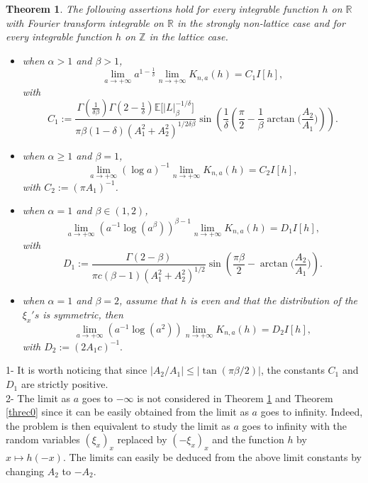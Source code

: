 \documentclass[oneside, a4paper,11pt,reqno]{amsart}
\newtheorem{thm}[hypo]{Theorem}
\begin{document}
\begin{thm}\label{threc2}
The following assertions hold for every integrable function $h$ on $\mathbb R$ 
with Fourier transform integrable on $\mathbb R$ in the strongly non-lattice case and for every integrable function $h$ on $\mathbb Z$ 
 in the lattice case.
\begin{itemize}
\item when $\alpha>1$ and $\beta>1$,
 $$\lim_{a\rightarrow +\infty}  a^{1-\frac 1 \delta}
    \lim_{n\rightarrow +\infty }   K_{n,a}(h)  =C_1  I[h],$$
with
$$ C_1:=\frac{ \Gamma(\frac{1}{\delta\beta})\Gamma(2-\frac{1}{\delta})\mathbb{E} 
\big[|L|_{\beta}^{-1/\delta}\big]}{\pi\beta (1-\delta)(A_1^2 +A_2^2)^{1/2\delta\beta}}
\sin\left(\frac{1}{\delta} \left(\frac{\pi}{2} -\frac{1}{\beta} \arctan 
\Big(\frac{A_2}{A_1}\Big)\right)\right).$$
\item when $\alpha\ge 1$ and $\beta=1$,
 $$\lim_{a\rightarrow +\infty} ( \log a)^{-1}
    \lim_{n\rightarrow +\infty }   K_{n,a}(h)  =C_2  I[h],$$
with $C_2:=(\pi A_1)^{-1}$.
\item when $\alpha=1$ and $\beta\in(1,2)$,
 $$ \lim_{a \rightarrow +\infty} \left(a^{-1}\log (a^\beta)\right)^{\beta-1}
    \lim_{n\rightarrow +\infty }   K_{n,a}(h)=D_1I[h],$$
with
$$D_1:= \frac{\Gamma(2-\beta) }
   {\pi c (\beta-1) (A_1^2+A_2^2)^{1/2}}
    \sin\left( \frac{\pi\beta}{2} -  \arctan \Big(\frac{A_2}{A_1}\Big) \right).$$
\item when $\alpha=1$ and $\beta=2$, assume that $h$ is even and that the distribution of the $\xi_x's$ is symmetric, then
 $$ \lim_{a\rightarrow +\infty} \left(a^{-1}  \log (a^2)\right) 
    \lim_{n\rightarrow +\infty }   K_{n,a}(h)=D_2I[h],$$
with $D_2:=(2 A_1 c)^{-1} .$
\end{itemize}
\end{thm}
1- It is worth noticing that since $|A_2/A_1|\leq |\tan( \pi\beta /2)|$,  the constants $C_1$ 
and $D_1$ are strictly positive.\\
2- The limit as $a$ goes to $-\infty$ is not considered in Theorem \ref{threc2} 
and Theorem \ref{threc0} since it can be easily obtained from the limit as $a$ goes to infinity. 
Indeed, the problem is then equivalent to study the limit as $a$ goes to infinity with the 
random variables  $(\xi_x)_x$ replaced by $(-\xi_x)_x$ and the function $h$ by 
$x\mapsto h(-x)$. 
The limits can easily be deduced from the above limit constants by changing  $A_2$ to $-A_2$.
\end{document}
